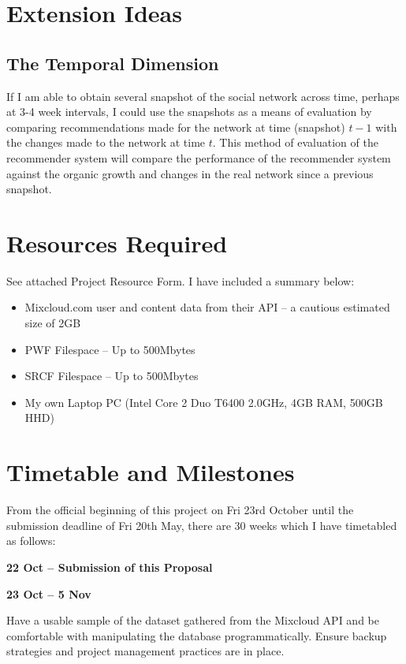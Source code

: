 \section{Extension Ideas}

\subsection*{The Temporal Dimension}
If I am able to obtain several snapshot of the social network across time, perhaps at 3-4 week intervals, I could use the snapshots as a means of evaluation by comparing recommendations made for the network at time (snapshot) $t-1$ with the changes made to the network at time $t$. This method of evaluation of the recommender system will compare the performance of the recommender system against the organic growth and changes in the real network since a previous snapshot.


\section{Resources Required}
See attached Project Resource Form. I have included a summary below:
\begin{itemize}
\item Mixcloud.com user and content data from their API -- a cautious estimated size of 2GB
\item PWF Filespace -- Up to 500Mbytes
\item SRCF Filespace  -- Up to 500Mbytes
\item My own Laptop PC (Intel Core 2 Duo T6400 2.0GHz, 4GB RAM, 500GB HHD)
\end{itemize}

\section{Timetable and Milestones}

From the official beginning of this project on Fri 23rd October until the submission deadline of Fri 20th May, there are 30 weeks which I have timetabled as follows:

\textbf{22 Oct -- Submission of this Proposal}

\textbf{23 Oct -- 5 Nov}

Have a usable sample of the dataset gathered from the Mixcloud API and be comfortable with manipulating the database programmatically.
Ensure backup strategies and project management practices are in place.

